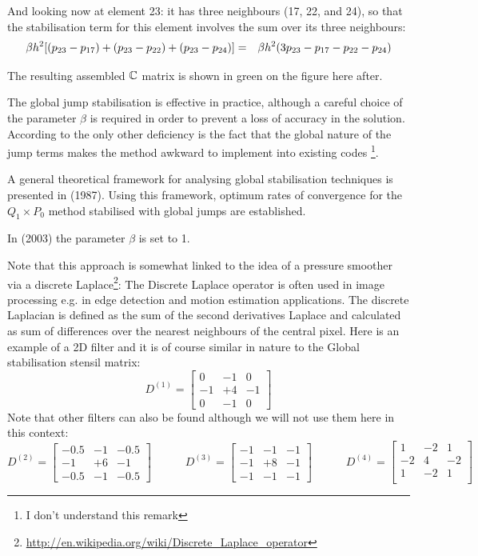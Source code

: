 And looking now at element 23: it has three neighbours (17, 22, and 24), so that 
the stabilisation term for this element involves the sum over its three neighbours:
\begin{eqnarray}
\beta h^2 [ (p_{23}-p_{17})+(p_{23}-p_{22}) +(p_{23}-p_{24})  ] 
&=& \beta h^2 ( 3 p_{23}-p_{17} -p_{22} - p_{24} )  \nonumber
\end{eqnarray}


The resulting assembled ${\mathbb{C}}$ matrix is shown in green on the figure here after.

The global jump stabilisation is effective in
practice, although a careful choice of the parameter $\beta$
is required in order to prevent a loss of accuracy in the solution.
According to \textcite{sike90} the only other deficiency is the fact that the global 
nature of the jump terms makes the method awkward to implement into existing 
codes \footnote{I don't understand this remark}.

A general theoretical framework for analysing global stabilisation techniques is
presented in \textcite{hufr87} (1987).
Using this framework, optimum rates of convergence for the $Q_1\times P_0$
method stabilised with global jumps are established.

In \textcite{cao03} (2003) the parameter $\beta$ is set to 1.

Note that this approach is somewhat linked to the idea of a pressure smoother 
via a discrete Laplace\footnote{\url{http://en.wikipedia.org/wiki/Discrete_Laplace_operator}}:
The Discrete Laplace operator is often used in image processing e.g. in edge detection and motion 
estimation applications. The discrete Laplacian is defined as the sum of the second derivatives Laplace 
and calculated as sum of differences over the nearest neighbours of the central pixel.
Here is an example of a 2D filter and it is of course similar in nature to the Global 
stabilisation stensil matrix:
\[
D^{(1)}=
\left[
\begin{array}{ccc}
0 &-1 &0\\
-1 &+4 &-1\\
0 &-1 &0
\end{array}
\right]
\]
Note that other filters can also be found although we will not use them here in this context:
\[
D^{(2)}=
\left[
\begin{array}{ccc}
-0.5 &-1 &-0.5\\
-1 &+6 &-1\\
-0.5 &-1 &-0.5
\end{array}
\right]
\quad\quad\quad
D^{(3)}=
\left[
\begin{array}{ccc}
-1 &-1 &-1\\
-1 &+8 &-1\\
-1 &-1 &-1
\end{array}
\right]
\quad\quad\quad
D^{(4)}=
\left[
\begin{array}{ccc}
1 & -2 & 1 \\
-2 & 4 & -2 \\
1 & -2 & 1 \\
\end{array}
\right]
\]


